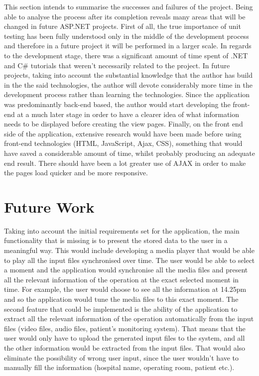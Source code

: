 This section intends to summarise the successes and failures of the project. Being able to analyse the process after its completion reveals many areas that  will be changed in future ASP.NET projects. First of all, the true importance of unit testing has been fully understood only in the middle of the development process and therefore in a future project it will be performed in a larger scale. In regards to the development stage, there was a significant amount of time spent of .NET and C\# tutorials that weren't necessarily related to the project. In future projects, taking into account the substantial knowledge that the author has build in the the said technologies, the author will devote considerably more time in the development process rather than learning the technologies. Since the application was predominantly back-end based, the author would start developing the front-end at a much later stage in order to have a clearer idea of what information needs to be displayed before creating the view pages. Finally, on the front end side of the application, extensive research would have been made before using front-end technologies (HTML, JavaScript, Ajax, CSS), something that would have saved a considerable amount of time, whilst probably producing an adequate end result. There should have been a lot greater use of AJAX in order to make the pages load quicker and be more responsive. 

\section{Future Work}

Taking into account the initial requirements set for the application, the main functionality that is missing is to present the stored data to the user in a meaningful way. This would include developing a media player that would be able to play all the input files synchronised over time. The user would be able to select a moment and the application would synchronise all the media files and present all the relevant information of the operation at the exact selected moment in time. For example, the user would choose to see all the information at 14.25pm and so the application would tune the media files to this exact moment. The second feature that could be implemented is the ability of the application to extract all the relevant information of the operation automatically from the input files (video files, audio files, patient's monitoring system). That means that the user would only have to upload the generated input files to the system, and all the other information would be extracted from the input files. That would also eliminate the possibility of wrong user input, since the user wouldn't have to manually fill the information (hospital name, operating room, patient etc.).


